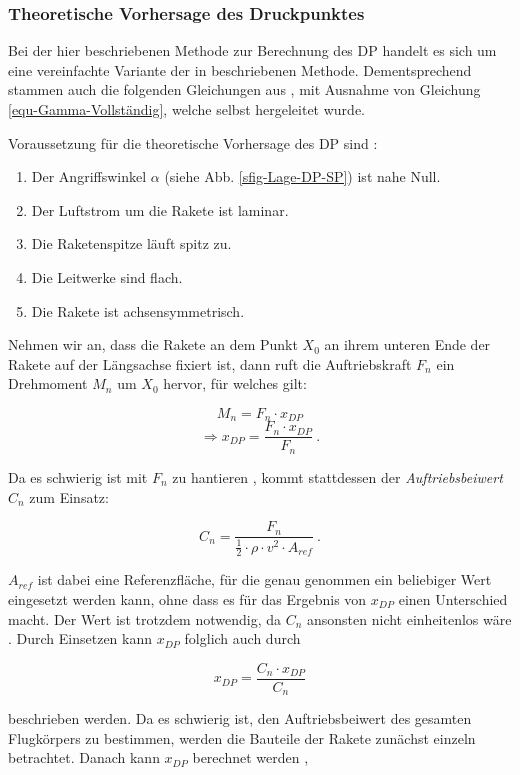 \documentclass[10pt,a4paper]{article}
\begin{document}
\subsubsection{Theoretische Vorhersage des Druckpunktes}

\label{Theorie-Stabi-Sec}
Bei der hier beschriebenen Methode zur Berechnung des DP handelt es sich um eine vereinfachte Variante der in \cite{sn} beschriebenen Methode. Dementsprechend stammen auch die folgenden Gleichungen aus \cite{sn}, mit Ausnahme von Gleichung \eqref{equ-Gamma-Vollständig}, welche selbst hergeleitet wurde.
\medskip

\noindent
Voraussetzung für die theoretische Vorhersage des DP sind \cite{sn}:
\begin{enumerate}
	\item Der Angriffswinkel $ \alpha $ (siehe Abb. \ref{sfig-Lage-DP-SP}) ist nahe Null.
	\item Der Luftstrom um die Rakete ist laminar.
	\item Die Raketenspitze läuft spitz zu.
	\item Die Leitwerke sind flach.
	\item Die Rakete ist achsensymmetrisch.
\end{enumerate}

\noindent
Nehmen wir an, dass die Rakete an dem Punkt $X_{0}$ an ihrem unteren Ende der Rakete auf der Längsachse fixiert ist, dann ruft die Auftriebskraft $F_{n}$ ein Drehmoment $M_{n}$ um $X_{0}$ hervor, für welches gilt:

\[ M_{n} = F_{n} \cdot x_{DP} \]
\[ \Rightarrow x_{DP} = \frac{F_{n} \cdot x_{DP}}  {F_{n}} \ . \]

\noindent
Da es schwierig ist mit $F_{n}$ zu hantieren \cite{sn}, kommt stattdessen der \textit{Auftriebsbeiwert} $C_{n}$ zum Einsatz:

\[ C_{n} = \dfrac{F_{n}}{\tfrac{1}{2} \cdot \rho \cdot v^{2} \cdot A_{ref}} \ . \]

\noindent
$A_{ref}$ ist dabei eine Referenzfläche, für die genau genommen ein beliebiger Wert eingesetzt werden kann, ohne dass es für das Ergebnis von $x_{DP}$ einen Unterschied macht. Der Wert ist trotzdem notwendig, da $C_{n}$ ansonsten nicht einheitenlos wäre \cite{sn}.
Durch Einsetzen kann $x_{DP}$ folglich auch durch

\[ x_{DP} = \frac{C_{n} \cdot x_{DP}}{C_{n}}  \]

\noindent
beschrieben werden. Da es schwierig ist, den Auftriebsbeiwert des gesamten Flugkörpers zu bestimmen, werden die Bauteile der Rakete zunächst einzeln betrachtet. Danach kann $x_{DP}$  berechnet werden \cite{AbR,sn},
\end{document}

